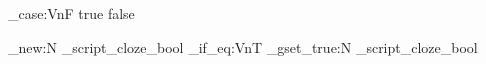 \ExplSyntaxOn
\str_case:VnF \ClozeMode
  { {true}{} {false}{} }
  { \PackageError{config}{Unknown ClozeMode '\ClozeMode'}{Use true or false.} }
\bool_new:N \g_script_cloze_bool
\str_if_eq:VnT  { \bool_gset_true:N \g_script_cloze_bool }
\ExplSyntaxOff
